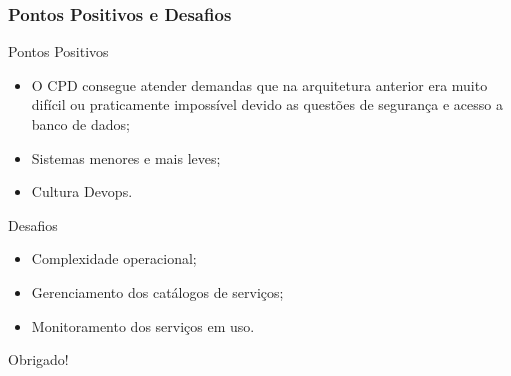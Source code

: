 \documentclass{beamer}
\begin{document}
\begin{frame}
  \frametitle{Pontos Positivos e Desafios}

  \begin{exampleblock}{Pontos Positivos}
  
	  \begin{itemize}
 	    \item<1->O CPD consegue atender demandas que na arquitetura anterior 
				 era muito difícil ou praticamente impossível devido as questões de segurança e acesso a banco de dados;
		\item<1->Sistemas menores e mais leves;
		\item<1->Cultura Devops.
	  \end{itemize}

  \end{exampleblock}


  \begin{exampleblock}{Desafios}
  
	  \begin{itemize}
 	    \item<1->Complexidade operacional;
		\item<1->Gerenciamento dos catálogos de serviços;
		\item<1->Monitoramento dos serviços em uso.
	  \end{itemize}

  \end{exampleblock}

  
\end{frame}


\begin{frame}[c]{ }
\centering
  \huge{Obrigado!}
\end{frame}
\end{document}
